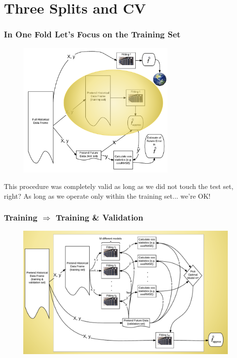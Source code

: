 \documentclass[handout]{beamer}
\begin{document}
\section{Three Splits and CV}

\begin{frame}\frametitle{In One Fold Let's Focus on the Training Set}
\vspace{-0.2cm}
\begin{figure}
\centering
\includegraphics[width=3.1in]{oos_validation_highlighted}
\end{figure}

\small
\vspace{-0.3cm}
\pause This procedure was completely valid as long as we did not touch the test set, right? \pause As long as we operate only within the training set... we're OK!
	
\end{frame}

\begin{frame}\frametitle{Training $\Rightarrow$ Training \& Validation}
\vspace{-0.5cm}
\begin{figure}
\centering
\includegraphics[width=4.4in]{training_validation}
\end{figure}
	
\end{frame}
\end{document}
